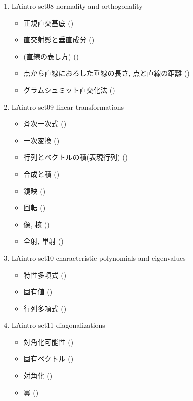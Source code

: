 \begin{enumerate}
\begin{itemize}
  \end{itemize}
\item
  LAintro set08 normality and orthogonality
  \begin{itemize}
  \item 正規直交基底 ()
  \item 直交射影と垂直成分 ()
  \item (直線の表し方) ()
  \item 点から直線におろした垂線の長さ, 点と直線の距離 ()
  \item グラムシュミット直交化法 ()
  \end{itemize}
\item
  LAintro set09 linear transformations
  \begin{itemize}
  \item 斉次一次式 ()
  \item 一次変換 ()
  \item 行列とベクトルの積(表現行列) ()
  \item 合成と積 ()
  \item 鏡映 ()
  \item 回転 ()
  \item 像, 核 ()
  \item 全射, 単射 ()
  \end{itemize}
\item
  LAintro set10 characteristic polynomials and eigenvalues
  \begin{itemize}
  \item 特性多項式 ()
  \item 固有値 ()
  \item 行列多項式 ()
  \end{itemize}
\item
  LAintro set11 diagonalizations
  \begin{itemize}
  \item 対角化可能性 ()
  \item 固有ベクトル ()
  \item 対角化 ()
  \item 冪 ()

\end{itemize}
\end{enumerate}
